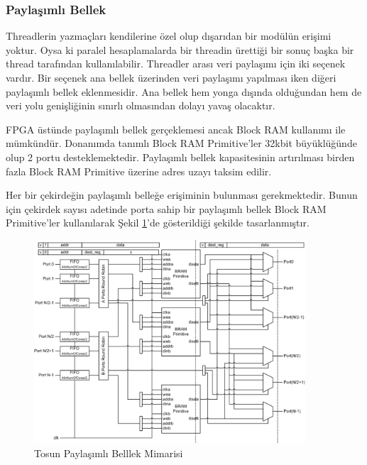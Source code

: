 \subsubsection{Paylaşımlı Bellek}
Threadlerin yazmaçları kendilerine özel olup dışarıdan bir modülün erişimi yoktur. Oysa ki paralel hesaplamalarda bir threadin ürettiği bir sonuç başka bir thread tarafından kullanılabilir. Threadler arası veri paylaşımı için iki seçenek vardır. Bir seçenek ana bellek üzerinden veri paylaşımı yapılması iken diğeri paylaşımlı bellek eklenmesidir. Ana bellek hem yonga dışında olduğundan hem de veri yolu genişliğinin sınırlı olmasından dolayı yavaş olacaktır.\par
FPGA üstünde paylaşımlı bellek gerçeklemesi ancak Block RAM kullanımı ile mümkündür. Donanımda tanımlı Block RAM Primitive'ler 32kbit büyüklüğünde olup 2 portu desteklemektedir. Paylaşımlı bellek kapasitesinin artırılması birden fazla Block RAM Primitive üzerine adres uzayı taksim edilir.\par
Her bir çekirdeğin paylaşımlı belleğe erişiminin bulunması gerekmektedir. Bunun için çekirdek sayısı adetinde porta sahip bir paylaşımlı bellek Block RAM Primitive'ler kullanılarak Şekil \ref{image:sharedMemory}'de gösterildiği şekilde tasarlanmıştır.
\begin{figure}[ht]
\centering
\shorthandoff{=}
\includegraphics[width=0.9\textwidth]{gorsel/sharedMemory.png}
\shorthandoff{=}
\caption{Tosun Paylaşımlı Belllek Mimarisi}
\label{image:sharedMemory}
\end{figure}

